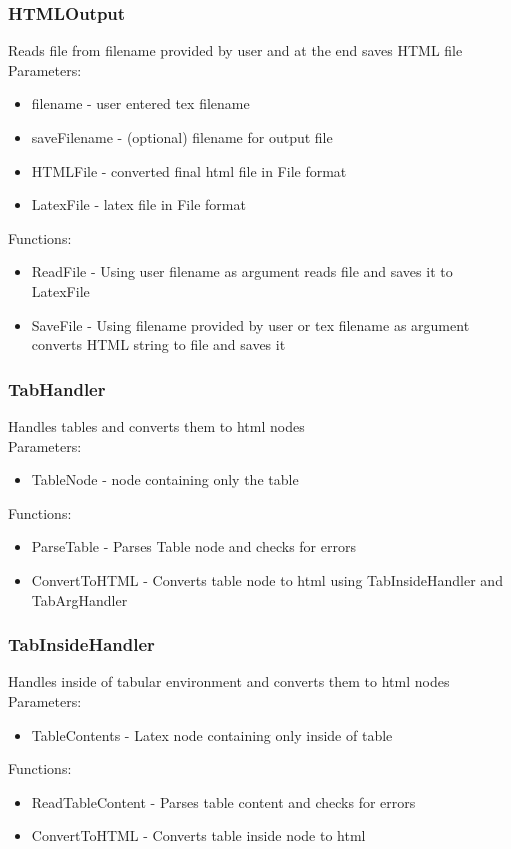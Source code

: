 \documentclass[12pt]{article}
\begin{document}
\subsubsection{HTMLOutput}
Reads file from filename provided by user and at the end saves HTML file \\ 
Parameters: \\ 
\begin{itemize}
\item filename - user entered tex filename
\item saveFilename - (optional) filename for output file 
\item HTMLFile - converted final html file in File format 
\item LatexFile - latex file in File format 
\end{itemize}
Functions: 
\begin{itemize}
    \item ReadFile - Using user filename as argument reads file and saves it to LatexFile
    \item SaveFile - Using filename provided by user or tex filename as argument converts HTML string to file and saves it 
\end{itemize}

\subsubsection{TabHandler}
Handles tables and converts them to html nodes \\ 
Parameters: \\ 
\begin{itemize}
\item TableNode - node containing only the table
\end{itemize}
Functions: 
\begin{itemize}
    \item ParseTable - Parses Table node and checks for errors
    \item ConvertToHTML - Converts table node to html using TabInsideHandler and TabArgHandler
\end{itemize}

\subsubsection{TabInsideHandler}
Handles inside of tabular environment and converts them to html nodes  \\ 
Parameters: \\ 
\begin{itemize}
\item TableContents - Latex node containing only inside of table
\end{itemize}
Functions: 
\begin{itemize}
    \item ReadTableContent - Parses table content and checks for errors 
    \item ConvertToHTML - Converts table inside node to html
\end{itemize}
\end{document}
